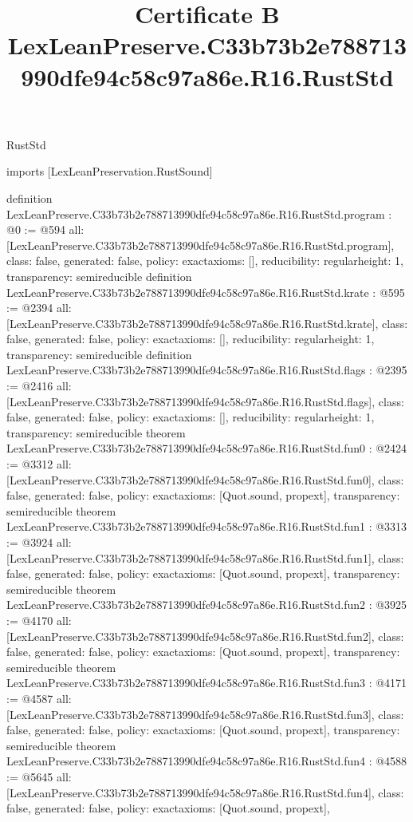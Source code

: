 \begin{lexlean}{RustStd}
\title{Certificate B LexLeanPreserve.C33b73b2e788713990dfe94c58c97a86e.R16.RustStd}
\begin{coremodule}
imports [LexLeanPreservation.RustSound]

definition LexLeanPreserve.C33b73b2e788713990dfe94c58c97a86e.R16.RustStd.program : @0 := @594 {
  all: [LexLeanPreserve.C33b73b2e788713990dfe94c58c97a86e.R16.RustStd.program],
  class: false,
  generated: false,
  policy: exact{axioms: []},
  reducibility: regular{height: 1},
  transparency: semireducible
}
definition LexLeanPreserve.C33b73b2e788713990dfe94c58c97a86e.R16.RustStd.krate : @595 := @2394 {
  all: [LexLeanPreserve.C33b73b2e788713990dfe94c58c97a86e.R16.RustStd.krate],
  class: false,
  generated: false,
  policy: exact{axioms: []},
  reducibility: regular{height: 1},
  transparency: semireducible
}
definition LexLeanPreserve.C33b73b2e788713990dfe94c58c97a86e.R16.RustStd.flags : @2395 := @2416 {
  all: [LexLeanPreserve.C33b73b2e788713990dfe94c58c97a86e.R16.RustStd.flags],
  class: false,
  generated: false,
  policy: exact{axioms: []},
  reducibility: regular{height: 1},
  transparency: semireducible
}
theorem LexLeanPreserve.C33b73b2e788713990dfe94c58c97a86e.R16.RustStd.fun0 : @2424 := @3312 {
  all: [LexLeanPreserve.C33b73b2e788713990dfe94c58c97a86e.R16.RustStd.fun0],
  class: false,
  generated: false,
  policy: exact{axioms: [Quot.sound, propext]},
  transparency: semireducible
}
theorem LexLeanPreserve.C33b73b2e788713990dfe94c58c97a86e.R16.RustStd.fun1 : @3313 := @3924 {
  all: [LexLeanPreserve.C33b73b2e788713990dfe94c58c97a86e.R16.RustStd.fun1],
  class: false,
  generated: false,
  policy: exact{axioms: [Quot.sound, propext]},
  transparency: semireducible
}
theorem LexLeanPreserve.C33b73b2e788713990dfe94c58c97a86e.R16.RustStd.fun2 : @3925 := @4170 {
  all: [LexLeanPreserve.C33b73b2e788713990dfe94c58c97a86e.R16.RustStd.fun2],
  class: false,
  generated: false,
  policy: exact{axioms: [Quot.sound, propext]},
  transparency: semireducible
}
theorem LexLeanPreserve.C33b73b2e788713990dfe94c58c97a86e.R16.RustStd.fun3 : @4171 := @4587 {
  all: [LexLeanPreserve.C33b73b2e788713990dfe94c58c97a86e.R16.RustStd.fun3],
  class: false,
  generated: false,
  policy: exact{axioms: [Quot.sound, propext]},
  transparency: semireducible
}
theorem LexLeanPreserve.C33b73b2e788713990dfe94c58c97a86e.R16.RustStd.fun4 : @4588 := @5645 {
  all: [LexLeanPreserve.C33b73b2e788713990dfe94c58c97a86e.R16.RustStd.fun4],
  class: false,
  generated: false,
  policy: exact{axioms: [Quot.sound, propext]},
}
\end{coremodule}
\end{lexlean}

